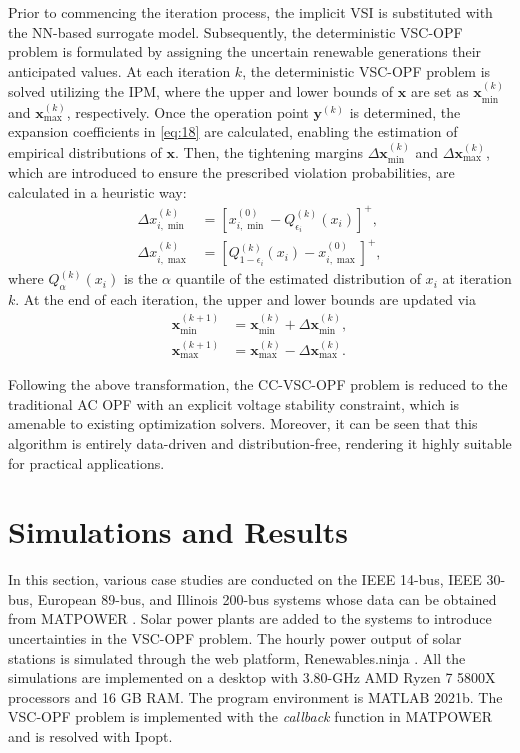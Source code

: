 \documentclass[journal]{IEEEtran}
\theoremstyle{definition}
\theoremstyle{remark}
\begin{document}
Prior to commencing the iteration process, the implicit VSI is substituted with the NN-based surrogate model. Subsequently, the deterministic VSC-OPF problem is formulated by assigning the uncertain renewable generations their anticipated values. At each iteration $k$, the deterministic VSC-OPF problem is solved utilizing the IPM, where the upper and lower bounds of $\boldsymbol{x}$ are set as $\boldsymbol{x}_{\min}^{(k)}$ and $\boldsymbol{x}_{\max}^{(k)}$, respectively. Once the operation point $\boldsymbol{y}^{(k)}$ is determined, the expansion coefficients in \eqref{eq:18} are calculated, enabling the estimation of empirical distributions of $\boldsymbol{x}$. 
Then, the tightening margins $\Delta\boldsymbol{x}_{\min}^{(k)}$ and $\Delta\boldsymbol{x}_{\max}^{(k)}$, which are introduced to ensure the prescribed violation probabilities, are calculated in a heuristic way:  
\begin{subequations}\label{eq:26}
    \begin{align}
        \Delta x_{i,\min}^{(k)}&=\left[x_{i,\min}^{(0)}-Q_{\epsilon_i}^{(k)}\left(x_i\right)\right]^+,\\
        \Delta x_{i,\max}^{(k)}&=\left[Q_{1-\epsilon_i}^{(k)}\left(x_i\right)-x_{i,\max}^{(0)}\right]^+,
    \end{align}
\end{subequations}
where $Q_{\alpha}^{(k)}(x_i)$ is the $\alpha$ quantile of the estimated distribution of $x_i$ at iteration $k$.
At the end of each iteration, the upper and lower bounds are updated via
\begin{subequations}\label{eq:27}
    \begin{align}
        \boldsymbol{x}_{\min}^{(k+1)}&=\boldsymbol{x}_{\min}^{(k)}+\Delta\boldsymbol{x}_{\min}^{(k)},\\
        \boldsymbol{x}_{\max}^{(k+1)}&=\boldsymbol{x}_{\max}^{(k)}-\Delta\boldsymbol{x}_{\max}^{(k)}.
    \end{align}
\end{subequations}

Following the above transformation, the CC-VSC-OPF problem is reduced to the traditional AC OPF with an explicit voltage stability constraint, which is amenable to existing optimization solvers.
Moreover, it can be seen that this algorithm is entirely data-driven and distribution-free, rendering it highly suitable for practical applications.
\section{Simulations and Results}\label{simulation}
In this section, various case studies are conducted on the IEEE 14-bus, IEEE 30-bus, European 89-bus, and Illinois 200-bus systems whose data can be obtained from MATPOWER \cite{zimmer2011matpower}. Solar power plants are added to the systems to introduce uncertainties in the VSC-OPF problem. The hourly power output of solar stations is simulated through the web platform, Renewables.ninja \cite{pfenninger2016long}. 
All the simulations are implemented on a desktop with 3.80-GHz AMD Ryzen 7 5800X processors and 16 GB RAM. The program environment is MATLAB 2021b. The VSC-OPF problem is implemented with the \textit{callback} function in MATPOWER and is resolved with Ipopt.
\vspace{-10pt}
\end{document}
